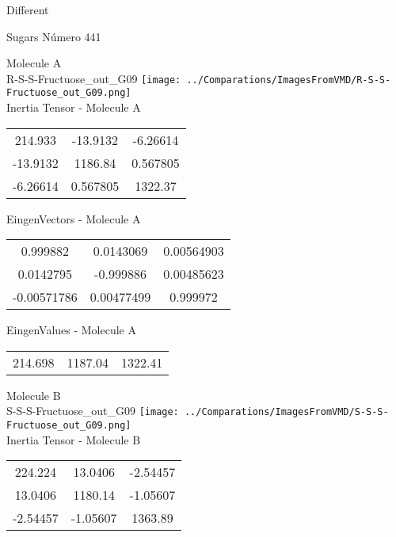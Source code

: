 \begin{center}
\vtab
\vtab
\textcolor{NavyBlue}{\Large Different}
\end{center}

 \newpage

\vtab[-2cm]
\begin{center}
{\large Sugars \tab Número 441}
\end{center}
\begin{multicols}{2}
\begin{center}

Molecule A \\ 
R-S-S-Fructuose\_out\_G09
\texttt{[image: ../Comparations/ImagesFromVMD/R-S-S-Fructuose\_out\_G09.png]}
\\
Inertia Tensor - Molecule A \\
\vtab

\begin{tabular}{|c c c|}
214.933	 & 	-13.9132	 & 	-6.26614	 \\
-13.9132	 & 	1186.84	 & 	0.567805	 \\
-6.26614	 & 	0.567805	 & 	1322.37
\end{tabular}

\vtab
 EingenVectors - Molecule A     \\
\vtab
\begin{tabular}{|c c c|}
0.999882	 & 	0.0143069	 & 	0.00564903	 \\
0.0142795	 & 	-0.999886	 & 	0.00485623	 \\
-0.00571786	 & 	0.00477499	 & 	0.999972
\end{tabular}

\vtab
 EingenValues - Molecule A     \\
\vtab
\begin{tabular}{|c c c|}
214.698	 & 	1187.04	 & 	1322.41	 \\
\end{tabular}
\columnbreak

Molecule B \\ 
S-S-S-Fructuose\_out\_G09
\texttt{[image: ../Comparations/ImagesFromVMD/S-S-S-Fructuose\_out\_G09.png]}
\\
Inertia Tensor - Molecule B \\
\vtab

\begin{tabular}{|c c c|}
224.224	 & 	13.0406	 & 	-2.54457	 \\
13.0406	 & 	1180.14	 & 	-1.05607	 \\
-2.54457	 & 	-1.05607	 & 	1363.89
\end{tabular}


\end{center}
\end{multicols}
